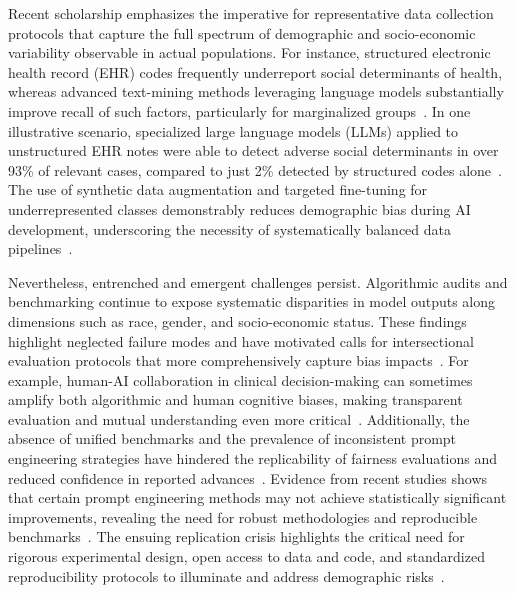 \documentclass[sigconf]{acmart}
\begin{document}
Recent scholarship emphasizes the imperative for representative data collection protocols that capture the full spectrum of demographic and socio-economic variability observable in actual populations. For instance, structured electronic health record (EHR) codes frequently underreport social determinants of health, whereas advanced text-mining methods leveraging language models substantially improve recall of such factors, particularly for marginalized groups~\cite{ref2,ref44,ref53}. In one illustrative scenario, specialized large language models (LLMs) applied to unstructured EHR notes were able to detect adverse social determinants in over 93\% of relevant cases, compared to just 2\% detected by structured codes alone~\cite{ref2}. The use of synthetic data augmentation and targeted fine-tuning for underrepresented classes demonstrably reduces demographic bias during AI development, underscoring the necessity of systematically balanced data pipelines~\cite{ref2,ref21,ref22,ref65}.

Nevertheless, entrenched and emergent challenges persist. Algorithmic audits and benchmarking continue to expose systematic disparities in model outputs along dimensions such as race, gender, and socio-economic status. These findings highlight neglected failure modes and have motivated calls for intersectional evaluation protocols that more comprehensively capture bias impacts~\cite{ref1,ref10,ref43,ref52,ref53}. For example, human-AI collaboration in clinical decision-making can sometimes amplify both algorithmic and human cognitive biases, making transparent evaluation and mutual understanding even more critical~\cite{ref52,ref53}. Additionally, the absence of unified benchmarks and the prevalence of inconsistent prompt engineering strategies have hindered the replicability of fairness evaluations and reduced confidence in reported advances~\cite{ref21,ref22,ref23,ref42}. Evidence from recent studies shows that certain prompt engineering methods may not achieve statistically significant improvements, revealing the need for robust methodologies and reproducible benchmarks~\cite{ref22}. The ensuing replication crisis highlights the critical need for rigorous experimental design, open access to data and code, and standardized reproducibility protocols to illuminate and address demographic risks~\cite{ref65}.
\end{document}
